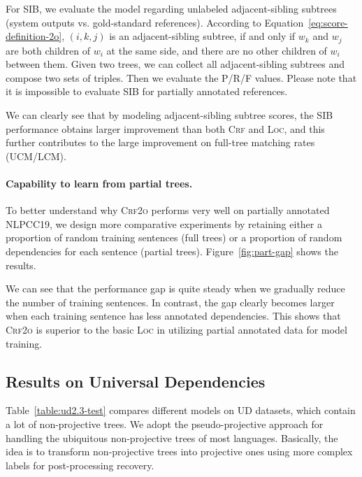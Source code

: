 \documentclass[11pt,a4paper]{article}
\begin{document}
For SIB, we evaluate the model regarding unlabeled adjacent-sibling subtrees (system outputs vs. gold-standard references). According to Equation~\ref{eq:score-definition-2o},
$(i,k,j)$ is an adjacent-sibling subtree, if and only if $w_k$ and $w_j$ are both children of $w_i$ at the same side, and there are no other children of $w_i$ between them.
Given two trees, we can collect all adjacent-sibling subtrees and compose two sets of triples.
Then we evaluate the P/R/F values.
Please note that it is impossible to evaluate SIB for partially annotated references.

We can clearly see that by modeling adjacent-sibling subtree scores,
the SIB performance obtains larger improvement than both \textsc{Crf} and \textsc{Loc},
and this further contributes to the large improvement on full-tree matching rates (UCM/LCM).





\paragraph{Capability to learn from partial trees.}

To better understand why \textsc{Crf2o} performs very well on partially annotated NLPCC19,
we design more comparative experiments by retaining either a proportion of random training sentences (full trees) or a proportion of random dependencies for each sentence (partial trees).
Figure~\ref{fig:part-gap} shows the results.


We can see that the performance gap is quite steady
when we gradually reduce the number of training sentences.
In contrast, the gap clearly becomes larger when each training sentence has less annotated dependencies.
This shows that \textsc{Crf2o} is superior to the basic \textsc{Loc} in
utilizing partial annotated data for model training.








 \subsection{Results on Universal Dependencies}

Table~\ref{table:ud2.3-test}
compares different models on UD datasets, which contain a lot of non-projective trees.
We adopt the pseudo-projective approach \cite{nivre-nilsson-2005-pseudo} for handling the ubiquitous non-projective trees of most languages. Basically, the idea is to transform non-projective trees into projective ones using more complex labels for post-processing recovery.
\end{document}
